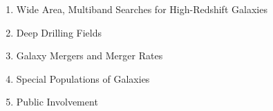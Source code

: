 {\begin{enumerate}
\begin{itemize}
\item Spiral Galaxies with LSB Disks
\item Dwarf Galaxies
\item Tidal Tails and Streams
\item Intracluster Light
\end{itemize}
\item Wide Area, Multiband Searches for High-Redshift Galaxies
\item Deep Drilling Fields
\item Galaxy Mergers and Merger Rates
\item Special Populations of Galaxies
\item Public Involvement
\end{enumerate}
}
